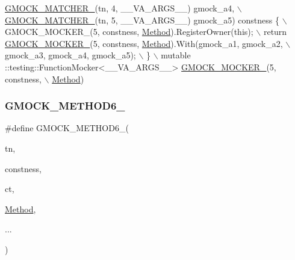 \begin{DoxyCode}
                     \hyperlink{gmock-generated-function-mockers_8h_aa87d0009fe91f1c89d658776b55a769c}{GMOCK\_MATCHER\_}(tn, 4, \_\_VA\_ARGS\_\_) gmock\_a4, \(\backslash\)
                     \hyperlink{gmock-generated-function-mockers_8h_aa87d0009fe91f1c89d658776b55a769c}{GMOCK\_MATCHER\_}(tn, 5, \_\_VA\_ARGS\_\_) gmock\_a5) constness \{ \(\backslash\)
    GMOCK\_MOCKER\_(5, constness, \hyperlink{gmock-spec-builders__test_8cc_a95606368148f3e5aab5db46c32466afd}{Method}).RegisterOwner(\textcolor{keyword}{this}); \(\backslash\)
    return \hyperlink{gmock-generated-function-mockers_8h_a7d362499e27b1bc3a9806dd3cf58a5b7}{GMOCK\_MOCKER\_}(5, constness, \hyperlink{gmock-spec-builders__test_8cc_a95606368148f3e5aab5db46c32466afd}{Method}).With(gmock\_a1, gmock\_a2, \(\backslash\)
        gmock\_a3, gmock\_a4, gmock\_a5); \(\backslash\)
  \} \(\backslash\)
  mutable ::testing::FunctionMocker<\_\_VA\_ARGS\_\_> \hyperlink{gmock-generated-function-mockers_8h_a7d362499e27b1bc3a9806dd3cf58a5b7}{GMOCK\_MOCKER\_}(5, constness, \(\backslash\)
      \hyperlink{gmock-spec-builders__test_8cc_a95606368148f3e5aab5db46c32466afd}{Method})
\end{DoxyCode}
\mbox{\label{gmock-generated-function-mockers_8h_ad0ca7f6973a076d0af4c953f8ed91842}} 
\subsubsection{\texorpdfstring{G\+M\+O\+C\+K\+\_\+\+M\+E\+T\+H\+O\+D6\+\_\+}{GMOCK\_METHOD6\_}}
{\footnotesize\ttfamily \#define G\+M\+O\+C\+K\+\_\+\+M\+E\+T\+H\+O\+D6\+\_\+(\begin{DoxyParamCaption}\item[{}]{tn,  }\item[{}]{constness,  }\item[{}]{ct,  }\item[{}]{\hyperlink{gmock-spec-builders__test_8cc_a95606368148f3e5aab5db46c32466afd}{Method},  }\item[{}]{... }\end{DoxyParamCaption})}

